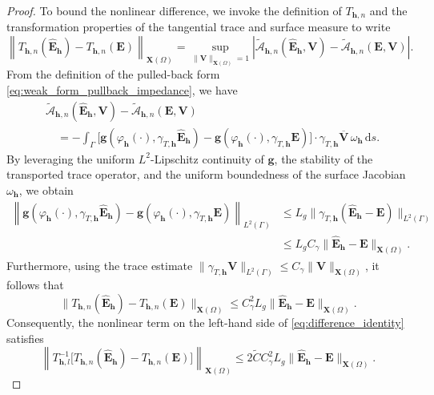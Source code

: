 \documentclass[12pt,reqno]{amsart}
\theoremstyle{definition}
\numberwithin{equation}{section}
\begin{document}
\begin{proof}
To bound the nonlinear difference, we invoke the definition of $T_{\mathbf{h},n}$ and the transformation properties of the tangential trace and surface measure to write
\[
\left\| T_{\mathbf{h},n}(\hat{\mathbf{E}}_{\mathbf{h}}) - T_{\mathbf{h},n}(\mathbf{E}) \right\|_{\mathbf{X}(\Omega)} = \sup_{\|\mathbf{V}\|_{\mathbf{X}(\Omega)}=1} \left| \widetilde{\mathcal{A}}_{\mathbf{h},n}(\hat{\mathbf{E}}_{\mathbf{h}}, \mathbf{V}) - \widetilde{\mathcal{A}}_{\mathbf{h},n}(\mathbf{E}, \mathbf{V}) \right|.
\]
From the definition of the pulled-back form \eqref{eq:weak_form_pullback_impedance}, we have
\[
\begin{aligned}
&\widetilde{\mathcal{A}}_{\mathbf{h},n}(\hat{\mathbf{E}}_{\mathbf{h}}, \mathbf{V}) - \widetilde{\mathcal{A}}_{\mathbf{h},n}(\mathbf{E}, \mathbf{V}) \\
&\quad = - \int_\Gamma \Big[ \mathbf{g}(\varphi_{\mathbf{h}}(\cdot), \gamma_{T,\mathbf{h}} \hat{\mathbf{E}}_{\mathbf{h}}) - \mathbf{g}(\varphi_{\mathbf{h}}(\cdot), \gamma_{T,\mathbf{h}} \mathbf{E}) \Big] \cdot \gamma_{T,\mathbf{h}} \overline{\mathbf{V}} \, \omega_{\mathbf{h}} \, \mathrm{d}s.
\end{aligned}
\]
By leveraging the uniform $L^2$-Lipschitz continuity of $\mathbf{g}$, the stability of the transported trace operator, and the uniform boundedness of the surface Jacobian $\omega_{\mathbf{h}}$, we obtain
\[
\begin{aligned}
\left\| \mathbf{g}(\varphi_{\mathbf{h}}(\cdot), \gamma_{T,\mathbf{h}} \hat{\mathbf{E}}_{\mathbf{h}}) - \mathbf{g}(\varphi_{\mathbf{h}}(\cdot), \gamma_{T,\mathbf{h}} \mathbf{E}) \right\|_{L^2(\Gamma)} &\le L_g \|\gamma_{T,\mathbf{h}} (\hat{\mathbf{E}}_{\mathbf{h}} - \mathbf{E})\|_{L^2(\Gamma)} \\
&\le L_g C_\gamma \|\hat{\mathbf{E}}_{\mathbf{h}} - \mathbf{E}\|_{\mathbf{X}(\Omega)}.
\end{aligned}
\]
Furthermore, using the trace estimate $\|\gamma_{T,\mathbf{h}} \mathbf{V}\|_{L^2(\Gamma)} \le C_\gamma \|\mathbf{V}\|_{\mathbf{X}(\Omega)}$, it follows that
\[
\|T_{\mathbf{h},n}(\hat{\mathbf{E}}_{\mathbf{h}}) - T_{\mathbf{h},n}(\mathbf{E})\|_{\mathbf{X}(\Omega)} \le C_\gamma^2 L_g \|\hat{\mathbf{E}}_{\mathbf{h}} - \mathbf{E}\|_{\mathbf{X}(\Omega)}.
\]
Consequently, the nonlinear term on the left-hand side of \eqref{eq:difference_identity} satisfies
\[
\left\| T_{\mathbf{h},l}^{-1} \big[ T_{\mathbf{h},n}(\hat{\mathbf{E}}_{\mathbf{h}}) - T_{\mathbf{h},n}(\mathbf{E}) \big] \right\|_{\mathbf{X}(\Omega)} \le 2\widetilde{C} C_\gamma^2 L_g \|\hat{\mathbf{E}}_{\mathbf{h}} - \mathbf{E}\|_{\mathbf{X}(\Omega)}.
\]


\end{proof}
\end{document}
